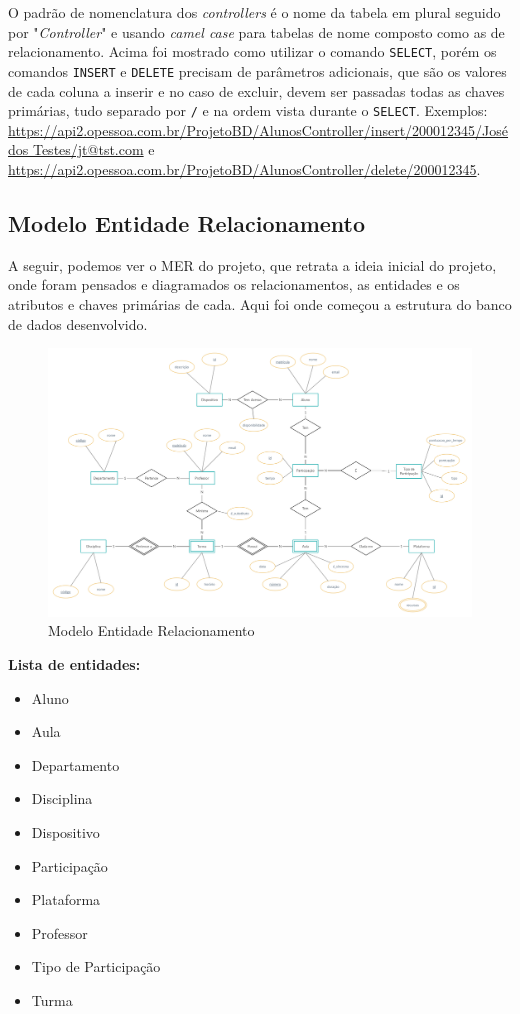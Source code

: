 \documentclass[12pt]{article}
\begin{document}
O padrão de nomenclatura dos \textit{controllers} é o nome da tabela em plural seguido por "\textit{Controller}" e usando \textit{camel case} para tabelas de nome composto como as de relacionamento. Acima foi mostrado como utilizar o comando \texttt{SELECT}, porém os comandos \texttt{INSERT} e \texttt{DELETE} precisam de parâmetros adicionais, que são os valores de cada coluna a inserir e no caso de excluir, devem ser passadas todas as chaves primárias, tudo separado por \texttt{/} e na ordem vista durante o \texttt{SELECT}. Exemplos: \url{https://api2.opessoa.com.br/ProjetoBD/AlunosController/insert/200012345/José dos Testes/jt@tst.com} e \url{https://api2.opessoa.com.br/ProjetoBD/AlunosController/delete/200012345}.

\subsection*{Modelo Entidade Relacionamento}
A seguir, podemos ver o MER do projeto, que retrata a ideia inicial do projeto, onde foram pensados e diagramados os relacionamentos, as entidades e os atributos e chaves primárias de cada. Aqui foi onde começou a estrutura do banco de dados desenvolvido.

\begin{figure}[H]
	\centering
    \includegraphics[width=1\textwidth]{MER.png}
    \caption{Modelo Entidade Relacionamento}
\end{figure}

\textbf{Lista de entidades:}
\begin{itemize}
    \setlength\itemsep{0.1em}
    \item Aluno
    \item Aula
    \item Departamento
    \item Disciplina
    \item Dispositivo
    \item Participação
    \item Plataforma
    \item Professor
    \item Tipo de Participação
    \item Turma
\end{itemize}
\end{document}
